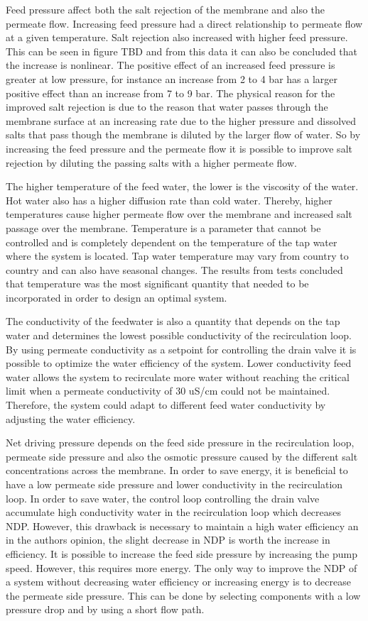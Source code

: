 Feed pressure affect both the salt rejection of the membrane and also the permeate flow. Increasing feed pressure had a direct relationship to permeate flow at a given temperature. Salt rejection also increased with higher feed pressure. This can be seen in figure TBD and from this data it can also be concluded that the increase is nonlinear. The positive effect of an increased feed pressure is greater at low pressure, for instance an increase from 2 to 4 bar has a larger positive effect than an increase from 7 to 9 bar. The physical reason for the improved salt rejection is due to the reason that water passes through the membrane surface at an increasing rate due to the higher pressure and dissolved salts that pass though the membrane is diluted by the larger flow of water. So by increasing the feed pressure and the permeate flow it is possible to improve salt rejection by diluting the passing salts with a higher permeate flow. 

The higher temperature of the feed water, the lower is the viscosity of the water. Hot water also has a higher diffusion rate than cold water. Thereby, higher temperatures cause higher permeate flow over the membrane and increased salt passage over the membrane. Temperature is a parameter that cannot be controlled and is completely dependent on the temperature of the tap water where the system is located. Tap water temperature may vary from country to country and can also have seasonal changes. The results from tests concluded that temperature was the most significant quantity that needed to be incorporated in order to design an optimal system. 

The conductivity of the feedwater is also a quantity that depends on the tap water and determines the lowest possible conductivity of the recirculation loop. By using permeate conductivity as a setpoint for controlling the drain valve it is possible to optimize the water efficiency of the system. Lower conductivity feed water allows the system to recirculate more water without reaching the critical limit when a permeate conductivity of 30 uS/cm could not be maintained. Therefore, the system could adapt to different feed water conductivity by adjusting the water efficiency.

Net driving pressure depends on the feed side pressure in the recirculation loop, permeate side pressure and also the osmotic pressure caused by the different salt concentrations across the membrane. In order to save energy, it is beneficial to have a low permeate side pressure and lower conductivity in the recirculation loop. In order to save water, the control loop controlling the drain valve accumulate high conductivity water in the recirculation loop which decreases NDP. However, this drawback is necessary to maintain a high water efficiency an in the authors opinion, the slight decrease in NDP is worth the increase in efficiency. It is possible to increase the feed side pressure by increasing the pump speed. However, this requires more energy. The only way to improve the NDP of a system without decreasing water efficiency or increasing energy is to decrease the permeate side pressure. This can be done by selecting components with a low pressure drop and by using a short flow path.

